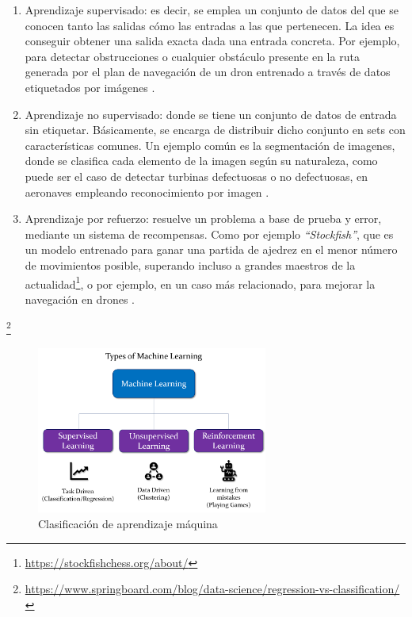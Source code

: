 \begin{enumerate}
	\item Aprendizaje supervisado: es decir, se emplea un conjunto de datos del que se conocen tanto las salidas cómo las entradas a las que pertenecen. La idea es conseguir obtener una salida exacta dada una entrada concreta. Por ejemplo, para detectar obstrucciones o cualquier obstáculo presente en la ruta generada por el plan de navegación de un dron entrenado a través de datos etiquetados por imágenes \cite{christl2020visionbased}.
	\item Aprendizaje no supervisado: donde se tiene un conjunto de datos de entrada sin etiquetar. Básicamente, se encarga de distribuir dicho conjunto en sets con características comunes. Un ejemplo común es la segmentación de imagenes, donde se clasifica cada elemento de la imagen según su naturaleza, como puede ser el caso de detectar turbinas defectuosas o no defectuosas, en aeronaves empleando reconocimiento por imagen \cite{wang2019unsupervised}.
    \item Aprendizaje por refuerzo: resuelve un problema a base de prueba y error, mediante un sistema de recompensas. Como por ejemplo \emph{``Stockfish''}, que es un modelo entrenado para ganar una partida de ajedrez en el menor número de movimientos posible, superando incluso a grandes maestros de la actualidad\footnote[15]{\url{https://stockfishchess.org/about/}}, o por ejemplo, en un caso más relacionado, para mejorar la navegación en drones \cite{electronics10090999}.
\end{enumerate}\footnote[16]{\url{https://www.springboard.com/blog/data-science/regression-vs-classification/}}

\begin{figure} [tp]
	\begin{center}
	\includegraphics[height=5.5cm]{imagenes/cap1/8_AI_types.png}
	\end{center}
	\caption[Clasificación de aprendizaje máquina]{Clasificación de aprendizaje máquina}
	\label{fig:ai_types}
\end{figure}

